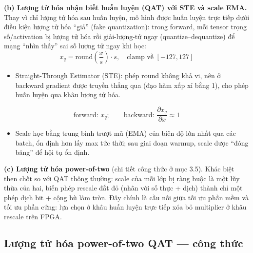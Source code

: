 \documentclass[12pt,a4paper]{article}
\begin{document}
\textbf{(b) Lượng tử hóa nhận biết huấn luyện (QAT) với STE và scale EMA.}
Thay vì chỉ lượng tử hóa sau huấn luyện, mô hình được huấn luyện trực tiếp dưới điều kiện
lượng tử hóa ``giả'' (fake quantization): trong forward, mỗi tensor trọng số/activation bị
lượng tử hóa rồi giải-lượng-tử ngay (quantize--dequantize) để mạng ``nhìn thấy'' sai số lượng
tử ngay khi học:
\begin{equation}
  x_q = \mathrm{round}\!\left(\frac{x}{s}\right)\cdot s, \quad \text{clamp về } [-127, 127]
\end{equation}
\begin{itemize}
  \item Straight-Through Estimator (STE): phép round không khả vi, nên ở backward gradient
        được truyền thẳng qua (đạo hàm xấp xỉ bằng 1), cho phép huấn luyện qua khâu lượng tử
        hóa.
\end{itemize}
\begin{equation}
  \text{forward: } x_q;\qquad \text{backward: } \frac{\partial x_q}{\partial x} \approx 1
\end{equation}
\begin{itemize}
  \item Scale học bằng trung bình trượt mũ (EMA) của biên độ lớn nhất qua các batch, ổn định
        hơn lấy max tức thời; sau giai đoạn warmup, scale được ``đóng băng'' để hội tụ ổn định.
\end{itemize}

\textbf{(c) Lượng tử hóa power-of-two} (chi tiết công thức ở mục 3.5).
Khác biệt then chốt so với QAT thông thường: scale của mỗi lớp bị ràng buộc là một lũy thừa
của hai, biến phép rescale đắt đỏ (nhân với số thực + dịch) thành chỉ một phép dịch bit + cộng
bù làm tròn. Đây chính là cầu nối giữa tối ưu phần mềm và tối ưu phần cứng: lựa chọn ở khâu
huấn luyện trực tiếp xóa bỏ multiplier ở khâu rescale trên FPGA.

\subsection{Lượng tử hóa power-of-two QAT --- công thức}
\end{document}
